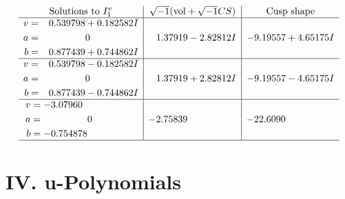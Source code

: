 \documentclass[1p]{elsarticle_modified}
\theoremstyle{definition}
\newcommand{\I}{\sqrt{-1}}
\begin{document}
$$\begin{array}{c|c|c}  
\text{Solutions to }I^v_{1}& \I (\text{vol} + \sqrt{-1}CS) & \text{Cusp shape}\\
 \hline 
\begin{aligned}
v &= \phantom{-}0.539798 + 0.182582 I \\
a &= \phantom{-0.000000 } 0 \\
b &= \phantom{-}0.877439 + 0.744862 I\end{aligned}
 & \phantom{-}1.37919 - 2.82812 I & -9.19557 + 4.65175 I \\ \hline\begin{aligned}
v &= \phantom{-}0.539798 - 0.182582 I \\
a &= \phantom{-0.000000 } 0 \\
b &= \phantom{-}0.877439 - 0.744862 I\end{aligned}
 & \phantom{-}1.37919 + 2.82812 I & -9.19557 - 4.65175 I \\ \hline\begin{aligned}
v &= -3.07960\phantom{ +0.000000I} \\
a &= \phantom{-0.000000 } 0 \\
b &= -0.754878\phantom{ +0.000000I}\end{aligned}
 & -2.75839\phantom{ +0.000000I} & -22.6090\phantom{ +0.000000I}\\
 \hline 
 \end{array}$$\newpage
\newpage\renewcommand{\arraystretch}{1}
\centering \section*{ IV. u-Polynomials}
\end{document}

